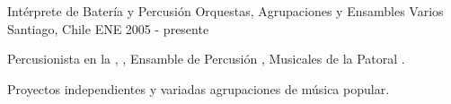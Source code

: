 \begin{cventries}
  \cventry
    {Intérprete de Batería y Percusión}
    {Orquestas, Agrupaciones y Ensambles Varios}
    {Santiago, Chile}
    {ENE 2005 - presente}
    {
    	\begin{cvitems} %
        \item {Percusionista en la , , Ensamble de Percusión , Musicales de la Patoral .}
        \item {Proyectos independientes y variadas agrupaciones de música popular.}
      \end{cvitems}
		}

% 
\end{cventries}
